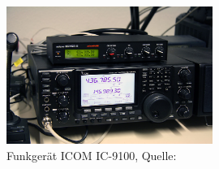 \begin{figure}[h]
	\centering
	\includegraphics[width=0.6\textwidth]{images/radio}
	\caption[Funkgerät ICOM IC-9100]{Funkgerät ICOM IC-9100, Quelle: \cite{dk0te}}
	\label{fig:radio}
\end{figure}



